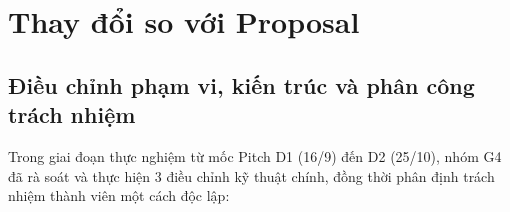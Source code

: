 \documentclass[10pt,a4paper]{article}
\begin{document}
\newpage
\setcounter{page}{1}

\section{Thay đổi so với Proposal}

\subsection{Điều chỉnh phạm vi, kiến trúc và phân công trách nhiệm}
Trong giai đoạn thực nghiệm từ mốc Pitch D1 (16/9) đến D2 (25/10), nhóm G4 đã rà soát và thực hiện 3 điều chỉnh kỹ thuật chính, đồng thời phân định trách nhiệm thành viên một cách độc lập:
\end{document}
